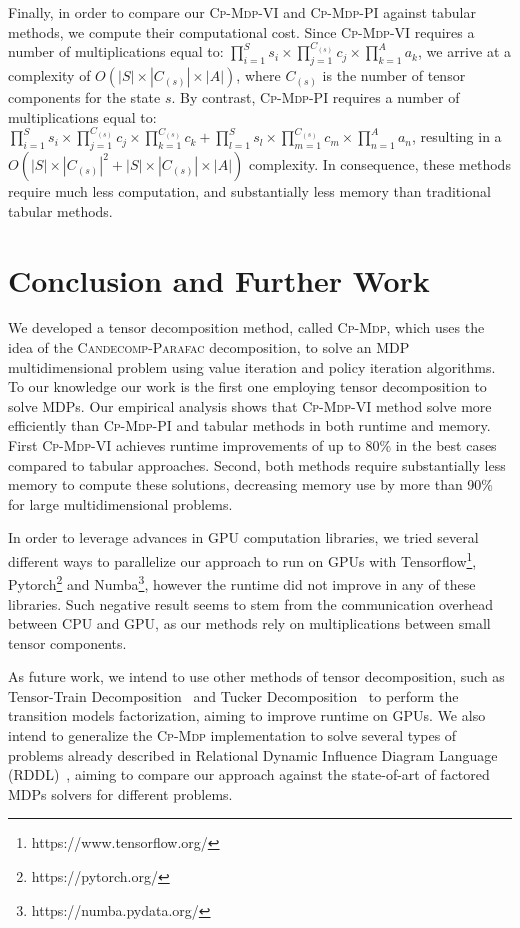 \documentclass[letterpaper]{article} %
\newcommand\cpmdp{\textsc{Cp-Mdp}}
\newcommand\candecompparafac{\textsc{Candecomp-Parafac}}
\newcommand\cpmdppi{\textsc{Cp-Mdp-PI}}
\newcommand\cpmdpvi{\textsc{Cp-Mdp-VI}}
\begin{document}
Finally, in order to compare our \cpmdpvi{} and \cpmdppi{} against tabular methods, we compute their computational cost. 
Since \cpmdpvi{} requires a number of multiplications equal to:
$\prod_{i=1}^{S} s_i \times \prod_{j=1}^{C_{(s)}} c_j \times \prod_{k=1}^{A} a_k$, 
\noindent we arrive at a complexity of $O(|S| \times |C_{(s)}| \times |A|)$, where $C_{(s)}$ is the number of tensor components for the state $s$.
By contrast, \cpmdppi{} requires a number of multiplications equal to:
$\prod_{i=1}^{S} s_i \times  \prod_{j=1}^{C_{(s)}} c_j  \times  \prod_{k=1}^{C_{(s)}} c_k + \prod_{l=1}^{S} s_l \times \prod_{m=1}^{C_{(s)}} c_m \times \prod_{n=1}^{A} a_n$,
\noindent resulting in a $O(|S| \times |C_{(s)}|^2 + |S| \times |C_{(s)}| \times |A|)$ complexity. 
In consequence, these methods require much less computation, and substantially less memory than traditional tabular methods. 




\section{Conclusion and Further Work}


We developed a tensor decomposition method, called \cpmdp{}, which uses the idea of the \candecompparafac{} decomposition, to solve an MDP multidimensional problem using value iteration and policy iteration algorithms. To our knowledge our work is the first one employing tensor decomposition to solve MDPs.
Our empirical analysis shows that \cpmdpvi{} method solve more efficiently than \cpmdppi{} and tabular methods in both runtime and memory.
First \cpmdpvi{} achieves runtime improvements of up to 80\% in the best cases compared to tabular approaches. 
Second, both methods require substantially less memory to compute these solutions, decreasing memory use by more than 90\% for large multidimensional problems. 

In order to leverage advances in GPU computation libraries, we tried several different ways to parallelize our approach to run on GPUs with Tensorflow\footnote{https://www.tensorflow.org/}, Pytorch\footnote{https://pytorch.org/} and Numba\footnote{https://numba.pydata.org/}, however the runtime did not improve in any of these libraries. 
Such negative result seems to stem from the communication overhead between CPU and GPU, as our methods rely on multiplications between small tensor components. 

As future work, we intend to use other methods of tensor decomposition, such as Tensor-Train Decomposition~\cite{TT-decomposition} and Tucker Decomposition~\cite{tucker} to perform the transition models factorization, aiming to improve runtime on GPUs. 
We also intend to generalize the \cpmdp{} implementation to solve several types of problems already described in Relational Dynamic Influence Diagram Language (RDDL)~\cite{rddl-scott-sanner}, aiming to compare our approach against the state-of-art of factored MDPs solvers for different problems.  


\clearpage

\end{document}
